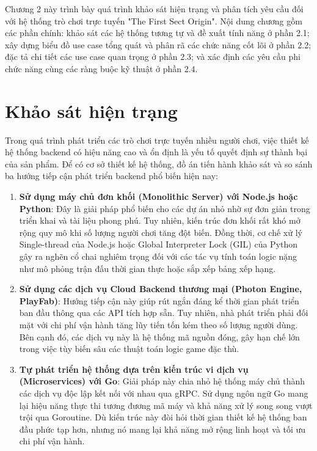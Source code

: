 \documentclass[../Project.tex]{subfiles}
\begin{document}
Chương 2 này trình bày quá trình khảo sát hiện trạng và phân tích yêu cầu đối với hệ thống trò chơi trực tuyến "The First Sect Origin". Nội dung chương gồm các phần chính: khảo sát các hệ thống tương tự và đề xuất tính năng ở phần 2.1; xây dựng biểu đồ use case tổng quát và phân rã các chức năng cốt lõi ở phần 2.2; đặc tả chi tiết các use case quan trọng ở phần 2.3; và xác định các yêu cầu phi chức năng cùng các ràng buộc kỹ thuật ở phần 2.4.

\section{Khảo sát hiện trạng}
Trong quá trình phát triển các trò chơi trực tuyến nhiều người chơi, việc thiết kế hệ thống backend có hiệu năng cao và ổn định là yếu tố quyết định sự thành bại của sản phẩm. Để có cơ sở thiết kế hệ thống, đồ án tiến hành khảo sát và so sánh ba hướng tiếp cận phát triển backend phổ biến hiện nay:

\begin{enumerate}
    \item \textbf{Sử dụng máy chủ đơn khối (Monolithic Server) với Node.js hoặc Python}: Đây là giải pháp phổ biến cho các dự án nhỏ nhờ sự đơn giản trong triển khai và tài liệu phong phú. Tuy nhiên, kiến trúc đơn khối rất khó mở rộng quy mô khi số lượng người chơi tăng đột biến. Đồng thời, cơ chế xử lý Single-thread của Node.js hoặc Global Interpreter Lock (GIL) của Python gây ra nghẽn cổ chai nghiêm trọng đối với các tác vụ tính toán logic nặng như mô phỏng trận đấu thời gian thực hoặc sắp xếp bảng xếp hạng.
    \item \textbf{Sử dụng các dịch vụ Cloud Backend thương mại (Photon Engine, PlayFab)}: Hướng tiếp cận này giúp rút ngắn đáng kể thời gian phát triển ban đầu thông qua các API tích hợp sẵn. Tuy nhiên, nhà phát triển phải đối mặt với chi phí vận hành tăng lũy tiến tốn kém theo số lượng người dùng. Bên cạnh đó, các dịch vụ này là hệ thống mã nguồn đóng, gây hạn chế lớn trong việc tùy biến sâu các thuật toán logic game đặc thù.
    \item \textbf{Tự phát triển hệ thống dựa trên kiến trúc vi dịch vụ (Microservices) với Go}: Giải pháp này chia nhỏ hệ thống máy chủ thành các dịch vụ độc lập kết nối với nhau qua gRPC. Sử dụng ngôn ngữ Go mang lại hiệu năng thực thi tương đương mã máy và khả năng xử lý song song vượt trội qua Goroutine. Dù kiến trúc này đòi hỏi thời gian thiết kế hệ thống ban đầu phức tạp hơn, nhưng nó mang lại khả năng mở rộng linh hoạt và tối ưu chi phí vận hành.
\end{enumerate}
\end{document}
